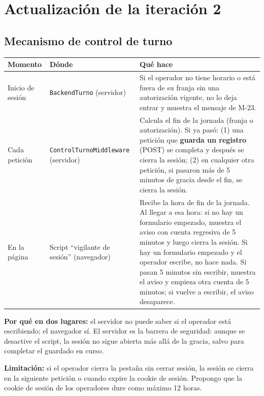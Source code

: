 \section{Actualización de la iteración 2}
\subsection{Mecanismo de control de turno}

\begin{longtable}{>{\raggedright\arraybackslash}p{1.6cm}>{\raggedright\arraybackslash}p{4.4cm}>{\raggedright\arraybackslash}p{8.4cm}}
\toprule
\textbf{Momento} & \textbf{Dónde} & \textbf{Qué hace}\\
\midrule\endhead
Inicio de sesión & \texttt{BackendTurno} (servidor) & Si el operador no tiene horario o está fuera de su franja sin una autorización vigente, no lo deja entrar y muestra el mensaje de M-23.\\
Cada petición & \texttt{ControlTurnoMiddleware} (servidor) & Calcula el fin de la jornada (franja o autorización). Si ya pasó: (1) una petición que \textbf{guarda un registro} (POST) se completa y después se cierra la sesión; (2) en cualquier otra petición, si pasaron más de 5 minutos de gracia desde el fin, se cierra la sesión.\\
En la página & Script ``vigilante de sesión'' (navegador) & Recibe la hora de fin de la jornada. Al llegar a esa hora: si no hay un formulario empezado, muestra el aviso con cuenta regresiva de 5 minutos y luego cierra la sesión. Si hay un formulario empezado y el operador escribe, no hace nada. Si pasan 5 minutos sin escribir, muestra el aviso y empieza otra cuenta de 5 minutos; si vuelve a escribir, el aviso desaparece.\\
\bottomrule
\end{longtable}


\textbf{Por qué en dos lugares:} el servidor no puede saber si el operador está escribiendo; el navegador sí. El servidor es la barrera de seguridad: aunque se desactive el script, la sesión no sigue abierta más allá de la gracia, salvo para completar el guardado en curso.


\textbf{Limitación:} si el operador cierra la pestaña sin cerrar sesión, la sesión se cierra en la siguiente petición o cuando expire la cookie de sesión. Propongo que la cookie de sesión de los operadores dure como máximo 12 horas.



